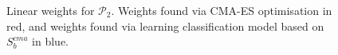 \begin{figure}\centering
\caption{Linear weights for $\mathcal{P_2}$. Weights found via CMA-ES optimisation in red, and weights found via learning classification model based on $S_b^{cma}$ in blue.}\label{fig:weights:p2}
\end{figure}


